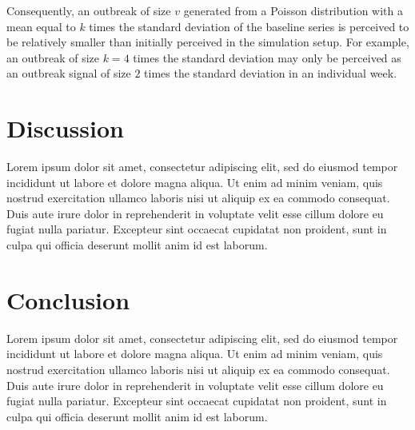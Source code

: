\documentclass[preprint, 3p, authoryear]{elsarticle} %
\begin{document}
Consequently, an outbreak of size \(v\) generated from a Poisson distribution with a mean equal to \(k\) times the standard deviation of the baseline series is perceived to be relatively smaller than initially perceived in the simulation setup. For example, an outbreak of size \(k=4\) times the standard deviation may only be perceived as an outbreak signal of size \(2\) times the standard deviation in an individual week.

\hypertarget{discussion}{%
\section{Discussion}\label{discussion}}

Lorem ipsum dolor sit amet, consectetur adipiscing elit, sed do eiusmod tempor incididunt ut labore et dolore magna aliqua. Ut enim ad minim veniam, quis nostrud exercitation ullamco laboris nisi ut aliquip ex ea commodo consequat. Duis aute irure dolor in reprehenderit in voluptate velit esse cillum dolore eu fugiat nulla pariatur. Excepteur sint occaecat cupidatat non proident, sunt in culpa qui officia deserunt mollit anim id est laborum.

\hypertarget{conclusion}{%
\section{Conclusion}\label{conclusion}}

Lorem ipsum dolor sit amet, consectetur adipiscing elit, sed do eiusmod tempor incididunt ut labore et dolore magna aliqua. Ut enim ad minim veniam, quis nostrud exercitation ullamco laboris nisi ut aliquip ex ea commodo consequat. Duis aute irure dolor in reprehenderit in voluptate velit esse cillum dolore eu fugiat nulla pariatur. Excepteur sint occaecat cupidatat non proident, sunt in culpa qui officia deserunt mollit anim id est laborum.

\renewcommand\refname{References}

\end{document}
